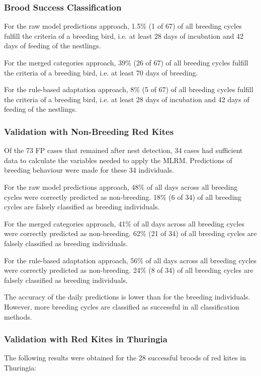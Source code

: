 \subsubsection{Brood Success Classification}
For the raw model predictions approach, 1.5\% (1 of 67) of all breeding cycles fulfill the criteria of a breeding bird, i.e. at least 28 days of incubation and 42 days of feeding of the nestlings.

For the merged categories approach, 39\% (26 of 67) of all breeding cycles fulfill the criteria of a breeding bird, i.e. at least 70 days of breeding.

For the rule-based adaptation approach, 8\% (5 of 67) of all breeding cycles fulfill the criteria of a breeding bird, i.e. at least 28 days of incubation and 42 days of feeding of the nestlings.



\subsubsection{Validation with Non-Breeding Red Kites}
Of the 73 FP cases that remained after nest detection, 34 cases had sufficient data to calculate the variables needed to apply the MLRM. Predictions of breeding behaviour were made for these 34 individuals.

For the raw model predictions approach, 48\% of all days across all breeding cycles were correctly predicted as non-breeding. 18\% (6 of 34) of all breeding cycles are falsely classified as breeding individuals.

For the merged categories approach, 41\% of all days across all breeding cycles were correctly predicted as non-breeding. 62\% (21 of 34) of all breeding cycles are falsely classified as breeding individuals.

For the rule-based adaptation approach, 56\% of all days across all breeding cycles were correctly predicted as non-breeding. 24\% (8 of 34) of all breeding cycles are falsely classified as breeding individuals.

The accuracy of the daily predictions is lower than for the breeding individuals. However, more breeding cycles are classified as successful in all classification methods.




\subsubsection{Validation with Red Kites in Thuringia}
The following results were obtained for the 28 successful broods of red kites in Thuringia:

